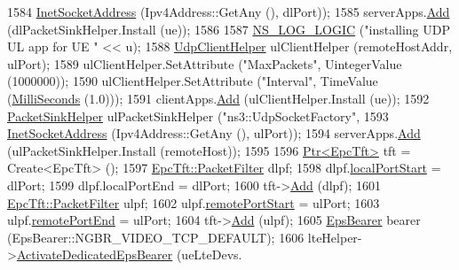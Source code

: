 \begin{DoxyCode}
1584                                                \hyperlink{classns3_1_1InetSocketAddress}{InetSocketAddress} (Ipv4Address::GetAny (), 
      dlPort));
1585           serverApps.\hyperlink{classns3_1_1ApplicationContainer_ad09ab1a1ad5849d518d5f4c262e38152}{Add} (dlPacketSinkHelper.Install (ue));
1586 
1587           \hyperlink{group__logging_ga88acd260151caf2db9c0fc84997f45ce}{NS\_LOG\_LOGIC} (\textcolor{stringliteral}{"installing UDP UL app for UE "} << u);
1588           \hyperlink{classns3_1_1UdpClientHelper}{UdpClientHelper} ulClientHelper (remoteHostAddr, ulPort);
1589           ulClientHelper.SetAttribute (\textcolor{stringliteral}{"MaxPackets"}, UintegerValue (1000000));
1590           ulClientHelper.SetAttribute (\textcolor{stringliteral}{"Interval"}, TimeValue (\hyperlink{group__timecivil_gaf26127cf4571146b83a92ee18679c7a9}{MilliSeconds} (1.0)));
1591           clientApps.\hyperlink{classns3_1_1ApplicationContainer_ad09ab1a1ad5849d518d5f4c262e38152}{Add} (ulClientHelper.Install (ue));
1592           \hyperlink{classns3_1_1PacketSinkHelper}{PacketSinkHelper} ulPacketSinkHelper (\textcolor{stringliteral}{"ns3::UdpSocketFactory"},
1593                                                \hyperlink{classns3_1_1InetSocketAddress}{InetSocketAddress} (Ipv4Address::GetAny (), 
      ulPort));
1594           serverApps.\hyperlink{classns3_1_1ApplicationContainer_ad09ab1a1ad5849d518d5f4c262e38152}{Add} (ulPacketSinkHelper.Install (remoteHost));
1595 
1596           \hyperlink{classns3_1_1Ptr}{Ptr<EpcTft>} tft = Create<EpcTft> ();
1597           \hyperlink{structns3_1_1EpcTft_1_1PacketFilter}{EpcTft::PacketFilter} dlpf;
1598           dlpf.\hyperlink{structns3_1_1EpcTft_1_1PacketFilter_afd505cda437b1687abc4432a8bcefbaf}{localPortStart} = dlPort;
1599           dlpf.localPortEnd = dlPort;
1600           tft->\hyperlink{classns3_1_1EpcTft_a1228456a8abbe48cbc89bbe2d2e9af48}{Add} (dlpf);
1601           \hyperlink{structns3_1_1EpcTft_1_1PacketFilter}{EpcTft::PacketFilter} ulpf;
1602           ulpf.\hyperlink{structns3_1_1EpcTft_1_1PacketFilter_aa96ab9356c91b14059220d00155c32b5}{remotePortStart} = ulPort;
1603           ulpf.\hyperlink{structns3_1_1EpcTft_1_1PacketFilter_a4bcdd15a9526e27eabd474276f691cf1}{remotePortEnd} = ulPort;
1604           tft->\hyperlink{classns3_1_1EpcTft_a1228456a8abbe48cbc89bbe2d2e9af48}{Add} (ulpf);
1605           \hyperlink{structns3_1_1EpsBearer}{EpsBearer} bearer (EpsBearer::NGBR\_VIDEO\_TCP\_DEFAULT);
1606           lteHelper->\hyperlink{classns3_1_1LteHelper_af28041edd4c96bde1a2e07c90e363dcc}{ActivateDedicatedEpsBearer} (ueLteDevs.

\end{DoxyCode}
